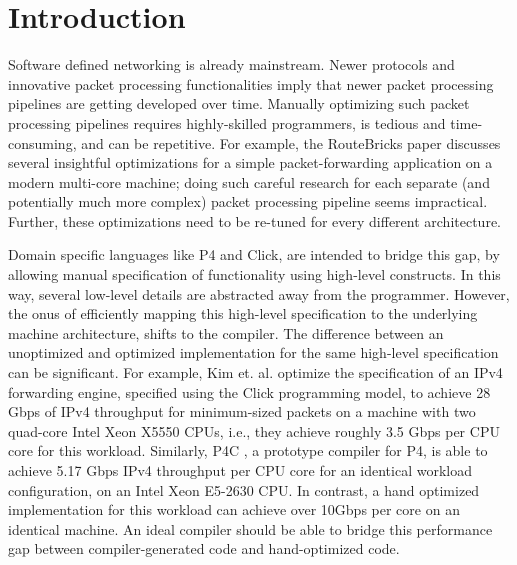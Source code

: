 \section{Introduction}
Software defined networking is already mainstream. Newer protocols and innovative packet
processing functionalities imply that
newer packet processing pipelines are getting developed over time. Manually
optimizing such packet processing pipelines requires highly-skilled programmers, is tedious
and time-consuming, and can be repetitive.
For example, the RouteBricks paper \cite{dobrescu2009routebricks} discusses several insightful optimizations
for a simple packet-forwarding application on a modern multi-core machine; doing such careful
research for each separate (and potentially much more complex) packet processing pipeline
seems impractical. Further, these optimizations need to be re-tuned for every different
architecture.

Domain specific languages like P4\cite{Bosshart:2014:PPP:2656877.2656890} and Click\cite{kohler2000click}, are intended
to bridge this gap, by allowing manual specification of functionality using high-level constructs. In this way, several
low-level details are abstracted away from the programmer. However, the onus of efficiently mapping this high-level
specification to the underlying machine architecture, shifts to the compiler. The difference between an unoptimized
and optimized implementation for the same high-level specification can be significant.
For example, Kim et. al. \cite{Kim:2012:PBC:2349896.2349910} optimize the specification of
an IPv4 forwarding engine, specified using the Click programming model, to achieve 28 Gbps of IPv4 throughput for minimum-sized
packets
on a machine with two quad-core Intel Xeon X5550 CPUs, i.e., they achieve roughly 3.5 Gbps per CPU core for this workload.
Similarly, P4C \cite{Laki:2016:HSP:2934872.2959080}, a prototype compiler for P4,
is able to achieve 5.17 Gbps IPv4 throughput per CPU core for an identical workload configuration, on an Intel Xeon E5-2630
CPU. In contrast, a hand optimized implementation for this workload can achieve over 10Gbps per core on an
identical machine. An ideal compiler should be able to
bridge this performance gap between compiler-generated code and hand-optimized code.

